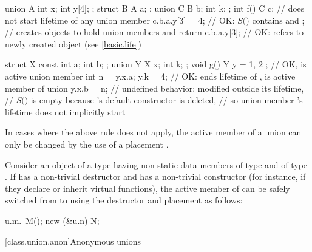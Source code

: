 \begin{example}
\begin{codeblock}
union A { int x; int y[4]; };
struct B { A a; };
union C { B b; int k; };
int f() {
  C c;                  // does not start lifetime of any union member
  c.b.a.y[3] = 4;       // OK: $S($$)$ contains  and ;
                        // creates objects to hold union members  and 
  return c.b.a.y[3];    // OK:  refers to newly created object (see \ref{basic.life})
}

struct X { const int a; int b; };
union Y { X x; int k; };
void g() {
  Y y = { { 1, 2 } };   // OK,  is active union member
  int n = y.x.a;
  y.k = 4;              // OK: ends lifetime of ,  is active member of union
  y.x.b = n;            // undefined behavior:  modified outside its lifetime,
                        // $S($$)$ is empty because 's default constructor is deleted,
                        // so union member 's lifetime does not implicitly start
}
\end{codeblock}
\end{example}

\pnum
\begin{note}
In cases where the above rule does not apply,
the active member of a union can only be changed by
the use of a placement .
\end{note}
\begin{example}
Consider an object  of a  type  having non-static data members
 of type  and  of type . If  has a non-trivial
destructor and  has a non-trivial constructor (for instance, if they declare or inherit
virtual functions), the active member of  can be safely switched from  to
 using the destructor and placement  as follows:

\begin{codeblock}
u.m.~M();
new (&u.n) N;
\end{codeblock}
\end{example}

[class.union.anon]{Anonymous unions}
%

